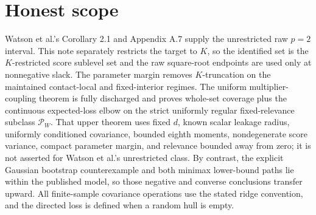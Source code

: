 \documentclass{article}
\begin{document}
\section{Honest scope}

Watson et al.'s Corollary 2.1 and Appendix A.7 supply the unrestricted raw \(p=2\) interval. This note separately restricts the target to \(K\), so the identified set is the \(K\)-restricted score sublevel set and the raw square-root endpoints are used only at nonnegative slack. The parameter margin removes \(K\)-truncation on the maintained contact-local and fixed-interior regimes. The uniform multiplier-coupling theorem is fully discharged and proves whole-set coverage plus the continuous expected-loss elbow on the strict uniformly regular fixed-relevance subclass \(\mathcal P_W\). That upper theorem uses fixed \(d\), known scalar leakage radius, uniformly conditioned covariance, bounded eighth moments, nondegenerate score variance, compact parameter margin, and relevance bounded away from zero; it is not asserted for Watson et al.'s unrestricted class. By contrast, the explicit Gaussian bootstrap counterexample and both minimax lower-bound paths lie within the published model, so those negative and converse conclusions transfer upward. All finite-sample covariance operations use the stated ridge convention, and the directed loss is defined when a random hull is empty.
\end{document}
